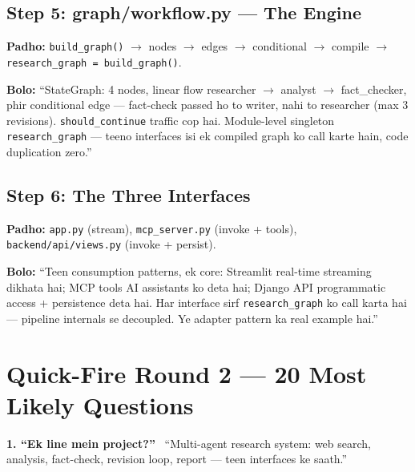 \subsection{Step 5: graph/workflow.py --- The Engine}

\begin{codestorybox}
\textbf{Padho:} \texttt{build\_graph()} $\rightarrow$ nodes $\rightarrow$ edges $\rightarrow$ conditional $\rightarrow$ compile $\rightarrow$ \texttt{research\_graph = build\_graph()}.

\textbf{Bolo:} ``StateGraph: 4 nodes, linear flow researcher $\rightarrow$ analyst $\rightarrow$ fact\_checker, phir conditional edge --- fact-check passed ho to writer, nahi to researcher (max 3 revisions). \texttt{should\_continue} traffic cop hai. Module-level singleton \texttt{research\_graph} --- teeno interfaces isi ek compiled graph ko call karte hain, code duplication zero.''
\end{codestorybox}

\subsection{Step 6: The Three Interfaces}

\begin{codestorybox}
\textbf{Padho:} \texttt{app.py} (stream), \texttt{mcp\_server.py} (invoke + tools), \texttt{backend/api/views.py} (invoke + persist).

\textbf{Bolo:} ``Teen consumption patterns, ek core: Streamlit real-time streaming dikhata hai; MCP tools AI assistants ko deta hai; Django API programmatic access + persistence deta hai. Har interface sirf \texttt{research\_graph} ko call karta hai --- pipeline internals se decoupled. Ye adapter pattern ka real example hai.''
\end{codestorybox}

\section{Quick-Fire Round 2 --- 20 Most Likely Questions}

\begin{interviewbox}
\textbf{1. ``Ek line mein project?''} \ ``Multi-agent research system: web search, analysis, fact-check, revision loop, report --- teen interfaces ke saath.''
\end{interviewbox}

